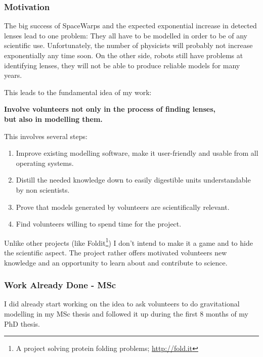 \documentclass[11pt]{article}
\begin{document}
\subsubsection{Motivation}

The big success of SpaceWarps and the expected exponential increase in detected lenses lead to one problem:
They all have to be modelled in order to be of any scientific use.
Unfortunately, the number of physicists will probably not increase exponentially any time soon.
On the other side, robots still have problems at identifying lenses, they will not be able to produce reliable models for many years.

This leads to the fundamental idea of my work:

{\bf Involve volunteers not only in the process of finding lenses,\\but also in modelling them.}

This involves several steps:

\begin{enumerate}
  \item Improve existing modelling software, make it user-friendly and usable from all operating systems.
  \item Distill the needed knowledge down to easily digestible units understandable by non scientists.
  \item Prove that models generated by volunteers are scientifically relevant.
  \item Find volunteers willing to spend time for the project.
\end{enumerate}

Unlike other projects (like Foldit\footnote{A project solving protein folding problems; \url{http://fold.it}}) I don't intend to make it a game and to hide the scientific aspect.
The project rather offers motivated volunteers new knowledge and an opportunity to learn about and contribute to science.


\subsubsection{Work Already Done - MSc}

I did already start working on the idea to ask volunteers to do gravitational modelling in my MSc thesis and followed it up during the first 8 months of my PhD thesis.
\end{document}

